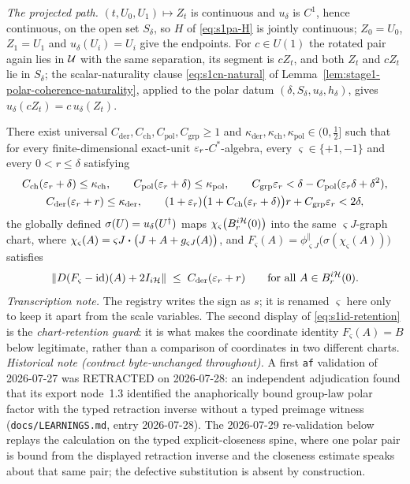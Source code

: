 \emph{The projected path.} $(t,U_0,U_1)\mapsto Z_t$ is continuous and $u_\delta$ is $C^{1}$,
hence continuous, on the open set $S_\delta$, so $H$ of \eqref{eq:s1pa-H} is jointly
continuous; $Z_0=U_0$, $Z_1=U_1$ and $u_\delta(U_i)=U_i$ give the endpoints. For $c\in U(1)$
the rotated pair again lies in $\mathcal U$ with the same separation, its segment is $cZ_t$, and
both $Z_t$ and $cZ_t$ lie in $S_\delta$; the scalar-naturality clause
\eqref{eq:s1cn-natural} of Lemma~\ref{lem:stage1-polar-coherence-naturality}, applied to the
polar datum $(\delta,S_\delta,u_\delta,h_\delta)$, gives $u_\delta(cZ_t)=c\,u_\delta(Z_t)$.

\begin{lemma}\label{lem:stage1-inversion-derivative-control}
There exist universal
$C_{\mathrm{der}},C_{\mathrm{ch}},C_{\mathrm{pol}},C_{\mathrm{grp}}\ge1$ and
$\kappa_{\mathrm{der}},\kappa_{\mathrm{ch}},\kappa_{\mathrm{pol}}\in(0,\tfrac12]$ such that
for every finite-dimensional exact-unit $\varepsilon_r$-$C^*$-algebra, every
$\varsigma\in\{+1,-1\}$ and every $0<r\le\delta$ satisfying
\begin{gather}
  C_{\mathrm{ch}}(\varepsilon_r+\delta)\le\kappa_{\mathrm{ch}},\qquad
  C_{\mathrm{pol}}(\varepsilon_r+\delta)\le\kappa_{\mathrm{pol}},\qquad
  C_{\mathrm{grp}}\varepsilon_r<\delta-C_{\mathrm{pol}}(\varepsilon_r\delta+\delta^{2}),
  \label{eq:s1id-guards}\\
  C_{\mathrm{der}}(\varepsilon_r+r)\le\kappa_{\mathrm{der}},\qquad
  (1+\varepsilon_r)\bigl(1+C_{\mathrm{ch}}(\varepsilon_r+\delta)\bigr)r+C_{\mathrm{grp}}\varepsilon_r<2\delta,
  \label{eq:s1id-retention}
\end{gather}
the globally defined $\sigma(U)=u_\delta(U^{\dagger})$ maps
$\chi_{\varsigma}\bigl(B^{i\mathcal H}_{r}(0)\bigr)$ into the same $\varsigma J$-graph chart,
where $\chi_{\varsigma}(A)=\varsigma J\mathbin{\bm{\cdot}}\bigl(J+A+g_{\varsigma J}(A)\bigr)$, and
$F_{\varsigma}(A)=\phi^{\parallel}_{\varsigma J}\bigl(\sigma(\chi_{\varsigma}(A))\bigr)$
satisfies
\begin{equation}\label{eq:s1id-derivative}
  \lVert D(F_{\varsigma}-\mathrm{id})(A)+2I_{i\mathcal H}\rVert\;\le\;C_{\mathrm{der}}(\varepsilon_r+r)
  \qquad\text{for all }A\in B^{i\mathcal H}_{r}(0).
\end{equation}
\emph{Transcription note.} The registry writes the sign as $s$; it is renamed $\varsigma$
here only to keep it apart from the scale variables. The second display of
\eqref{eq:s1id-retention} is the \emph{chart-retention guard}: it is what makes the
coordinate identity $F_{\varsigma}(A)=B$ below legitimate, rather than a comparison of
coordinates in two different charts.
\emph{Historical note (contract byte-unchanged throughout).} A first \texttt{af} validation
of 2026-07-27 was RETRACTED on 2026-07-28: an independent adjudication found that its export
node~1.3 identified the anaphorically bound group-law polar factor with the typed retraction
inverse without a typed preimage witness (\texttt{docs/LEARNINGS.md}, entry 2026-07-28). The
2026-07-29 re-validation below replays the calculation on the typed explicit-closeness
spine, where one polar pair is bound from the displayed retraction inverse and the closeness
estimate speaks about that same pair; the defective substitution is absent by construction.
\end{lemma}

